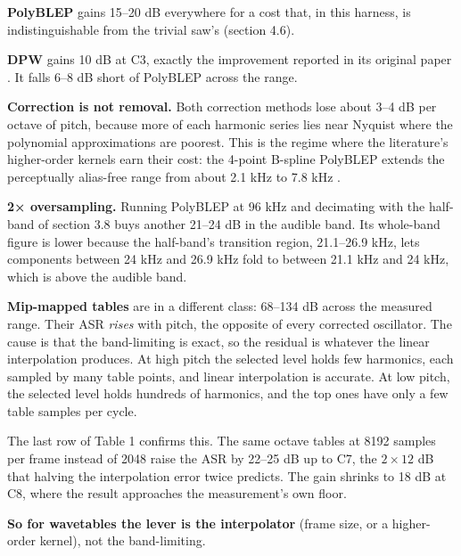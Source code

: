 \documentclass[conference]{IEEEtran}
\begin{document}
\textbf{PolyBLEP} gains 15–20 dB everywhere for a cost that, in this harness, is indistinguishable from the trivial saw's (section 4.6).

\textbf{DPW} gains 10 dB at C3, exactly the improvement reported in its original paper \cite{r36}. It falls 6–8 dB short of PolyBLEP across the range.

\textbf{Correction is not removal.} Both correction methods lose about 3–4 dB per octave of pitch, because more of each harmonic series lies near Nyquist where the polynomial approximations are poorest. This is the regime where the literature's higher-order kernels earn their cost: the 4-point B-spline PolyBLEP extends the perceptually alias-free range from about 2.1 kHz to 7.8 kHz \cite{r40}.

\textbf{2× oversampling.} Running PolyBLEP at 96 kHz and decimating with the half-band of section 3.8 buys another 21–24 dB in the audible band. Its whole-band figure is lower because the half-band's transition region, 21.1–26.9 kHz, lets components between 24 kHz and 26.9 kHz fold to between 21.1 kHz and 24 kHz, which is above the audible band.

\textbf{Mip-mapped tables} are in a different class: 68–134 dB across the measured range. Their ASR \emph{rises} with pitch, the opposite of every corrected oscillator. The cause is that the band-limiting is exact, so the residual is whatever the linear interpolation produces. At high pitch the selected level holds few harmonics, each sampled by many table points, and linear interpolation is accurate. At low pitch, the selected level holds hundreds of harmonics, and the top ones have only a few table samples per cycle.

The last row of Table 1 confirms this. The same octave tables at 8192 samples per frame instead of 2048 raise the ASR by 22–25 dB up to C7, the $2 \times 12$ dB that halving the interpolation error twice predicts. The gain shrinks to 18 dB at C8, where the result approaches the measurement's own floor.

\textbf{So for wavetables the lever is the interpolator} (frame size, or a higher-order kernel), not the band-limiting.

\setcounter{subsection}{2}
\end{document}
